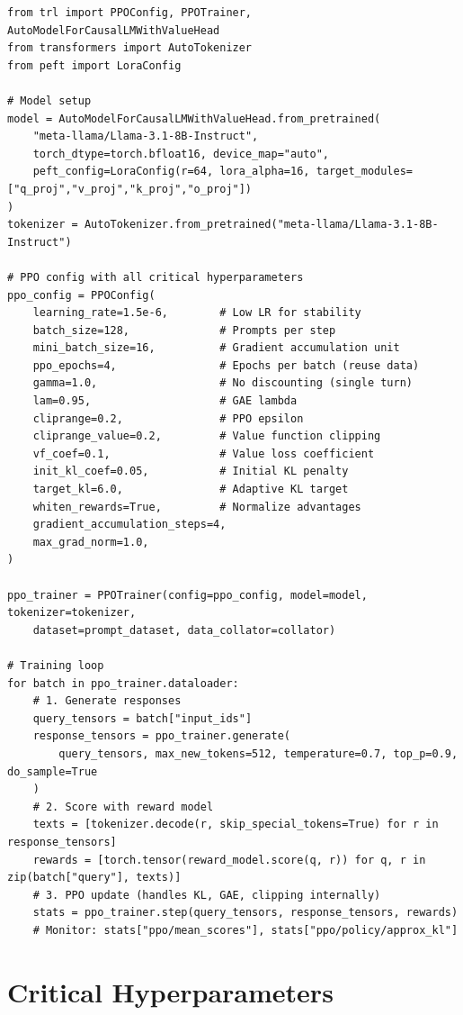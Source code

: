 \begin{lstlisting}[style=pythonstyle]
from trl import PPOConfig, PPOTrainer, AutoModelForCausalLMWithValueHead
from transformers import AutoTokenizer
from peft import LoraConfig

# Model setup
model = AutoModelForCausalLMWithValueHead.from_pretrained(
    "meta-llama/Llama-3.1-8B-Instruct",
    torch_dtype=torch.bfloat16, device_map="auto",
    peft_config=LoraConfig(r=64, lora_alpha=16, target_modules=["q_proj","v_proj","k_proj","o_proj"])
)
tokenizer = AutoTokenizer.from_pretrained("meta-llama/Llama-3.1-8B-Instruct")

# PPO config with all critical hyperparameters
ppo_config = PPOConfig(
    learning_rate=1.5e-6,        # Low LR for stability
    batch_size=128,              # Prompts per step
    mini_batch_size=16,          # Gradient accumulation unit
    ppo_epochs=4,                # Epochs per batch (reuse data)
    gamma=1.0,                   # No discounting (single turn)
    lam=0.95,                    # GAE lambda
    cliprange=0.2,               # PPO epsilon
    cliprange_value=0.2,         # Value function clipping
    vf_coef=0.1,                 # Value loss coefficient
    init_kl_coef=0.05,           # Initial KL penalty
    target_kl=6.0,               # Adaptive KL target
    whiten_rewards=True,         # Normalize advantages
    gradient_accumulation_steps=4,
    max_grad_norm=1.0,
)

ppo_trainer = PPOTrainer(config=ppo_config, model=model, tokenizer=tokenizer,
    dataset=prompt_dataset, data_collator=collator)

# Training loop
for batch in ppo_trainer.dataloader:
    # 1. Generate responses
    query_tensors = batch["input_ids"]
    response_tensors = ppo_trainer.generate(
        query_tensors, max_new_tokens=512, temperature=0.7, top_p=0.9, do_sample=True
    )
    # 2. Score with reward model
    texts = [tokenizer.decode(r, skip_special_tokens=True) for r in response_tensors]
    rewards = [torch.tensor(reward_model.score(q, r)) for q, r in zip(batch["query"], texts)]
    # 3. PPO update (handles KL, GAE, clipping internally)
    stats = ppo_trainer.step(query_tensors, response_tensors, rewards)
    # Monitor: stats["ppo/mean_scores"], stats["ppo/policy/approx_kl"]
\end{lstlisting}

\section{Critical Hyperparameters}
\label{critical-hyperparameters}

